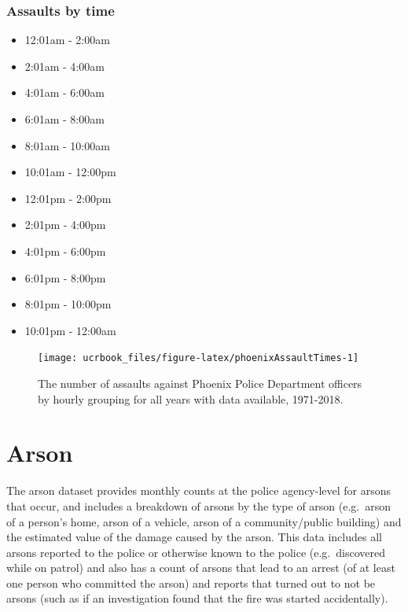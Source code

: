 \documentclass[
  12pt,
  openany]{book}
\providecommand{\tightlist}{%
  \setlength{\itemsep}{0pt}\setlength{\parskip}{0pt}}
\begin{document}
\hypertarget{assaults-by-time}{%
\subsection{Assaults by time}\label{assaults-by-time}}

\begin{itemize}
\tightlist
\item
  12:01am - 2:00am
\item
  2:01am - 4:00am
\item
  4:01am - 6:00am
\item
  6:01am - 8:00am
\item
  8:01am - 10:00am
\item
  10:01am - 12:00pm
\item
  12:01pm - 2:00pm
\item
  2:01pm - 4:00pm
\item
  4:01pm - 6:00pm
\item
  6:01pm - 8:00pm
\item
  8:01pm - 10:00pm
\item
  10:01pm - 12:00am
\end{itemize}

\begin{figure}

{\centering \texttt{[image: ucrbook\_files/figure-latex/phoenixAssaultTimes-1]} 

}

\caption{The number of assaults against Phoenix Police Department officers by hourly grouping for all years with data available, 1971-2018.}\label{fig:phoenixAssaultTimes}
\end{figure}

\hypertarget{arson-1}{%
\chapter{Arson}\label{arson-1}}

The arson dataset provides monthly counts at the police agency-level for arsons that occur, and includes a breakdown of arsons by the type of arson (e.g.~arson of a person's home, arson of a vehicle, arson of a community/public building) and the estimated value of the damage caused by the arson. This data includes all arsons reported to the police or otherwise known to the police (e.g.~discovered while on patrol) and also has a count of arsons that lead to an arrest (of at least one person who committed the arson) and reports that turned out to not be arsons (such as if an investigation found that the fire was started accidentally).
\end{document}
